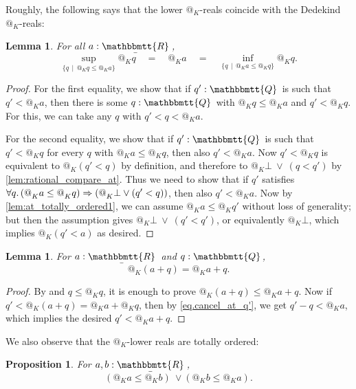 \documentclass[11pt, oneside, article]{memoir}
\makeatletter
\theoremstyle{plain}
\newtheorem{proposition}[theorem]{Proposition}
\newtheorem{lemma}[theorem]{Lemma}
\theoremstyle{definition}
\theoremstyle{remark}
\newcommand{\ubar}[1]{\underaccent{\bar}{#1}}
\newcommand{\internal}[1]{\raisebox{-.03ex}{$\mathbbmtt{#1}$}}
\newcommand{\hs}{\hspace{1.1pt}}
\newcommand{\tQQ}{\internal{Q}\hs}
\newcommand{\tRR}{\internal{R}\hs}
\newcommand{\tLR}{\ubar{\tRR}\hs}
\newcommand{\AtSymbol}{{@}}
\newcommand{\At}[2][]{\AtSymbol^{#1}_{#2}}
\newcommand{\imp}{\Rightarrow}
\makeatother
\begin{document}
Roughly, the following says that the lower $\At{K}$-reals coincide with the Dedekind $\At{K}$-reals:

\begin{lemma}
	\label{lem:at_lower_real}
	For all $a : \tLR$,
	\[
		\sup_{\{q \,\mid\, \At{K} q \leq \At{K} a\}} \At{K} q
		\quad = \quad
		\At{K}a 
		\quad = \quad
		\inf_{\{q \, \mid\, \At{K} a \leq \At{K} q\}} \At{K} q.
	\]
\end{lemma}

\begin{proof}
	For the first equality, we show that if $q' : \tQQ$ is such that $q' < \At{K}a$, then there is some $q : \tQQ$ with $\At{K} q \leq \At{K} a$ and $q' < \At{K} q$. For this, we can take any $q$ with $q' < q < \At{K}a$.

	For the second equality, we show that if $q' : \tQQ$ is such that $q' < \At{K} q$ for every $q$ with $\At{K} a \leq \At{K} q$, then also $q' < \At{K}a$. Now $q' < \At{K} q$ is equivalent to $\At{K}(q' < q)$ by definition, and therefore to $\At{K}\bot \:\lor\: (q < q')$ by \cref{lem:rational_compare_at}. Thus we need to show that if $q'$ satisfies $\forall q\ldotp (\At{K} a \leq \At{K} q) \imp (\At{K} \bot \lor (q' < q))$, then also $q' < \At{K} a$. Now by \cref{lem:at_totally_ordered1}, we can assume $\At{K} a \leq \At{K} q'$ without loss of generality; but then the assumption gives $\At{K}\bot \:\lor\: (q' < q')$, or equivalently $\At{K}\bot$, which implies $\At{K}(q' < a)$ as desired.
\end{proof}

\begin{lemma}
	\label{lem.at_plus_rational}
	For $a : \tLR$ and $q : \tQQ$,
	\[
		\At{K}(a + q) = \At{K}a + q.
	\]
\end{lemma}

\begin{proof}
	By  and $q \leq \At{K} q$, it is enough to prove $\At{K}(a + q) \leq \At{K}a + q$. Now if $q' < \At{K}(a + q) = \At{K} a + \At{K}q$, then by \eqref{eq.cancel_at_q'}, we get $q' - q < \At{K} a$, which implies the desired $q' < \At{K} a + q$.
\end{proof}

We also observe that the $\At{K}$-lower reals are totally ordered:

\begin{proposition}
	\label{prop.at_LR_total_order}
	For $a,b : \tLR$,
	\[
		(\At{K}a \leq \At{K}b) \: \lor (\At{K}b \leq \At{K}a).
	\]
\end{proposition}
\end{document}

